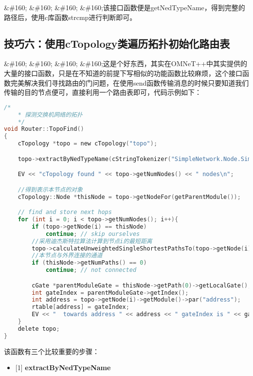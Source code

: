\&\#160; \&\#160; \&\#160; \&\#160;该接口函数便是getNedTypeName，得到完整的路径后，使用c库函数strcmp进行判断即可。

\subsection{技巧六：使用cTopology类遍历拓扑初始化路由表}
\label{技巧六：使用ctopology类遍历拓扑初始化路由表}

\&\#160; \&\#160; \&\#160; \&\#160;这是个好东西，其实在OMNeT++中其实提供的大量的接口函数，只是在不知道的前提下写相似的功能函数比较麻烦，这个接口函数完美解决我们寻找路由的门问题，在使用send函数传输消息的时候只要知道我们传输的目的节点便可，直接利用一个路由表即可，代码示例如下：

\begin{lstlisting}[language=c]
/*
    * 探测交换机网络的拓扑
    */
void Router::TopoFind()
{
    cTopology *topo = new cTopology("topo");

    topo->extractByNedTypeName(cStringTokenizer("SimpleNetwork.Node.SimpleNode               SimpleNetwork.Switch.SimpleSwitch").asVector());

    EV << "cTopology found " << topo->getNumNodes() << " nodes\n";

    //得到表示本节点的对象
    cTopology::Node *thisNode = topo->getNodeFor(getParentModule());

    // find and store next hops
    for (int i = 0; i < topo->getNumNodes(); i++){
        if (topo->getNode(i) == thisNode)
            continue; // skip ourselves
        //采用迪杰斯特拉算法计算到节点i的最短距离
        topo->calculateUnweightedSingleShortestPathsTo(topo->getNode(i));
        //本节点与外界连接的通道
        if (thisNode->getNumPaths() == 0)
            continue; // not connected

        cGate *parentModuleGate = thisNode->getPath(0)->getLocalGate();
        int gateIndex = parentModuleGate->getIndex();
        int address = topo->getNode(i)->getModule()->par("address");
        rtable[address] = gateIndex;
        EV << "  towards address " << address << " gateIndex is " << gateIndex  << endl;
    }
    delete topo;
}

\end{lstlisting}

该函数有三个比较重要的步骤：

\begin{itemize}
\item {[1]} \textbf{extractByNedTypeName}

\end{itemize}

